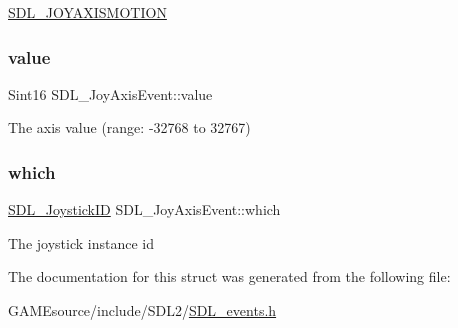 \mbox{\hyperlink{_s_d_l__events_8h_a3b589e89be6b35c02e0dd34a55f3fccaaf0803b3f8a12de3d85f81ebd7b514cd1}{S\+D\+L\+\_\+\+J\+O\+Y\+A\+X\+I\+S\+M\+O\+T\+I\+ON}} \mbox{\label{struct_s_d_l___joy_axis_event_a53ee73e7c367934dd6edb69963be5556}} 
\subsubsection{\texorpdfstring{value}{value}}
{\footnotesize\ttfamily Sint16 S\+D\+L\+\_\+\+Joy\+Axis\+Event\+::value}

The axis value (range\+: -\/32768 to 32767) \mbox{\label{struct_s_d_l___joy_axis_event_a965719f4703a7091bcc5f07f79fcf7e1}} 
\subsubsection{\texorpdfstring{which}{which}}
{\footnotesize\ttfamily \mbox{\hyperlink{_s_d_l__joystick_8h_a3c3d32500cb08f76ee8077983912c0bd}{S\+D\+L\+\_\+\+Joystick\+ID}} S\+D\+L\+\_\+\+Joy\+Axis\+Event\+::which}

The joystick instance id 

The documentation for this struct was generated from the following file\+:\begin{DoxyCompactItemize}
\item 
G\+A\+M\+Esource/include/\+S\+D\+L2/\mbox{\hyperlink{_s_d_l__events_8h}{S\+D\+L\+\_\+events.\+h}}\end{DoxyCompactItemize}
